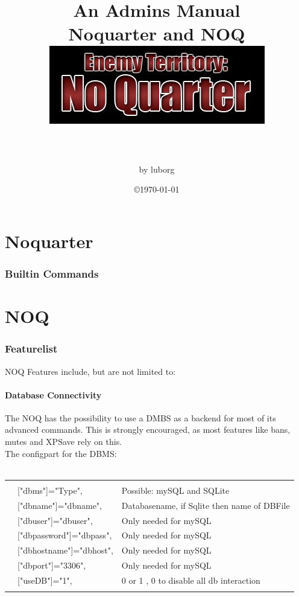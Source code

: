 \documentclass[12pt,a4paper]{article}
\author{ by luborg}  %
\title{An Admins Manual \\
Noquarter and NOQ\\
\includegraphics{noquarter.jpg} \\
\ifthenelse{\boolean{onKW}}{ Kernwaffe Edition }{ Open Edition }
\\
}			%
\date{ \copyright\today}				%
\begin{document}
\maketitle

\newpage

\setcounter{page}{2}

\tableofcontents   %

\newpage 
\part{Noquarter}
\section{Builtin Commands}

\newcommand{\inclnqcmds}{ }
\newcommand{\inclnqkwcmds}{ }

\ifthenelse{\boolean{onKW}}{\inclnqcmds}{\inclnqkwcmds}

\newpage

\part{NOQ}
\section{Featurelist}
NOQ Features include, but are not limited to:

\subsection{Database Connectivity}

The NOQ has the possibility to use a DMBS as a backend for most of its advanced commands.
This is strongly encouraged, as most features like bans, mutes and XPSave rely on this.
\\
The configpart for the DBMS:
\\
\\
\begin{tabular}{l l|l}
\hline & & \\
&	["dbms"]="Type", 			& Possible: mySQL and SQLite \\
&	["dbname"]="dbname", 		& Databasename, if Sqlite then name of DBFile\\
&	["dbuser"]="dbuser", 		& Only needed for mySQL\\
&	["dbpassword"]="dbpass", 	& Only needed for mySQL\\
&	["dbhostname"]="dbhost", 	& Only needed for mySQL\\
&	["dbport"]="3306",    		& Only needed for mySQL\\
& 	["useDB"]="1",				& 0 or 1 , 0 to disable all db interaction \\   
& &  \\
 \hline
\end{tabular}	
		
\end{document}
